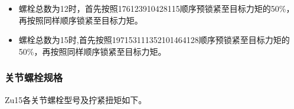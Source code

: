 \documentclass[a4paper,11pt,english,openany,oneside]{sphinxmanual}
\begin{document}
\sphinxAtStartPar
{}
\begin{itemize}
\item {} 
\sphinxAtStartPar
螺栓总数为12时，首先按照1\sphinxhyphen{}7\sphinxhyphen{}6\sphinxhyphen{}12\sphinxhyphen{}3\sphinxhyphen{}9\sphinxhyphen{}10\sphinxhyphen{}4\sphinxhyphen{}2\sphinxhyphen{}8\sphinxhyphen{}11\sphinxhyphen{}5顺序预锁紧至目标力矩的50\%，再按照同样顺序锁紧至目标力矩。

\item {} 
\sphinxAtStartPar
螺栓总数为15时,首先按照1\sphinxhyphen{}9\sphinxhyphen{}7\sphinxhyphen{}15\sphinxhyphen{}3\sphinxhyphen{}11\sphinxhyphen{}13\sphinxhyphen{}5\sphinxhyphen{}2\sphinxhyphen{}10\sphinxhyphen{}14\sphinxhyphen{}6\sphinxhyphen{}4\sphinxhyphen{}12\sphinxhyphen{}8顺序预锁紧至目标力矩的50\%，再按照同样顺序锁紧至目标力矩。

\end{itemize}


\subsubsection{关节螺栓规格}
\label{\detokenize{_u66f4_u6362_u5173_u8282:id9}}\label{\detokenize{_u66f4_u6362_u5173_u8282:id10}}
\sphinxAtStartPar
Zu15各关节螺栓型号及拧紧扭矩如下。
\end{document}
